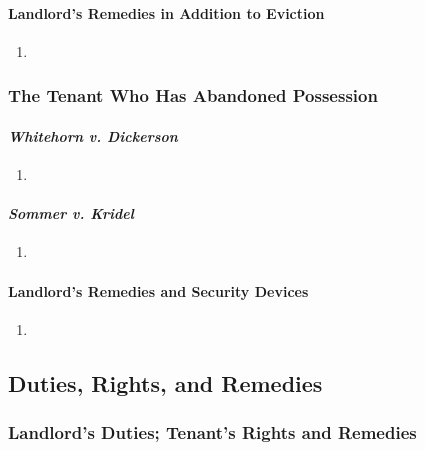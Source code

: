 \paragraph{Landlord's Remedies in Addition to Eviction}

\begin{enumerate}
    \item %
\end{enumerate}

\subsubsection{The Tenant Who Has Abandoned Possession}

\paragraph{\emph{Whitehorn v. Dickerson}}

\begin{enumerate}
    \item %
\end{enumerate}

\paragraph{\emph{Sommer v. Kridel}}

\begin{enumerate}
    \item %
\end{enumerate}

\paragraph{Landlord's Remedies and Security Devices}

\begin{enumerate}
    \item %
\end{enumerate}

\subsection{Duties, Rights, and Remedies}

\subsubsection{Landlord's Duties; Tenant's Rights and Remedies}


